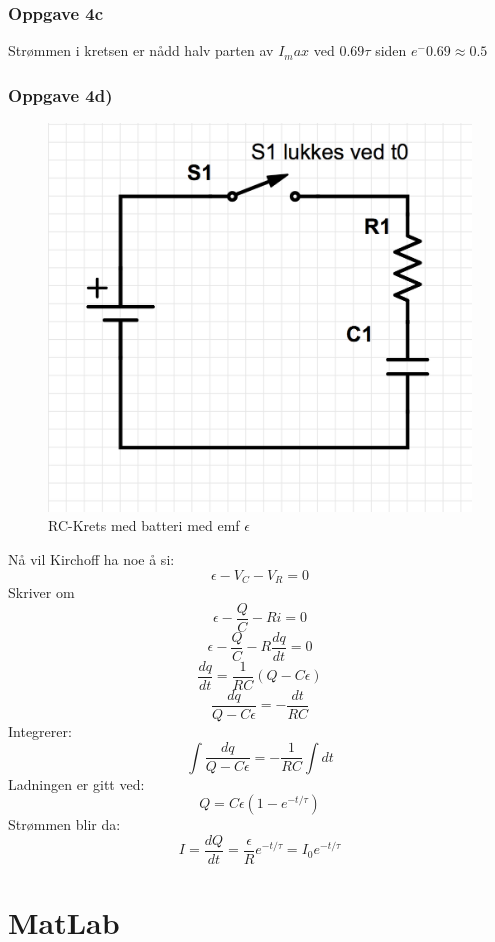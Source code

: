 \documentclass[12pt,a4paper,final,leqno]{report}
\begin{document}
\subsection*{Oppgave 4c}
Strømmen i kretsen er nådd halv parten av $I_max$ ved $0.69 \tau$ siden $e^-0.69\approx 0.5$

\subsection*{Oppgave 4d)}
\begin{figure}[H]
\caption{RC-Krets med batteri med emf $\epsilon$}
\centering
\includegraphics[width=\textwidth]{krets.jpg}
\end{figure}

Nå vil Kirchoff ha noe å si:
$$
\epsilon - V_C-V_R=0
$$
Skriver om 
$$\epsilon - \frac{Q}{C} -Ri=0
$$
$$
\epsilon- \frac{Q}{C}- R \frac{dq}{dt}=0
$$
$$
\frac{dq}{dt}=\frac{1}{RC}(Q-C\epsilon)
$$
$$
\frac{dq}{Q-C\epsilon }=-\frac{dt}{RC}
$$
Integrerer:
$$
\int \frac{dq}{Q-C\epsilon }=-\frac{1}{RC}\int dt
$$
Ladningen er gitt ved:
$$
Q=C\epsilon (1-e^{-t/\tau})
$$
Strømmen blir da:
$$
I=\frac{dQ}{dt}=\frac{\epsilon}{R} e^{-t/\tau}=I_0e^{-t/\tau}
$$
\chapter*{MatLab}
\end{document}
